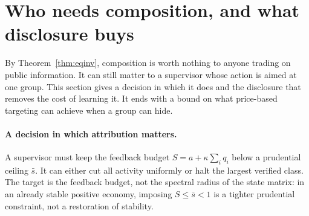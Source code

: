 \documentclass[12pt]{article}
\theoremstyle{definition}
\theoremstyle{remark}
\begin{document}
\section{Who needs composition, and what disclosure buys}\label{sec:supervision}

By Theorem~\ref{thm:eqinv}, composition is worth nothing to anyone trading on public information. It can still matter to a supervisor whose action is aimed at one group. This section gives a decision in which it does and the disclosure that removes the cost of learning it. It ends with a bound on what price-based targeting can achieve when a group can hide.

\paragraph{A decision in which attribution matters.} A supervisor must keep the feedback budget $S=a+\kappa\sum_iq_i$ below a prudential ceiling $\bar s$. It can either cut all activity uniformly or halt the largest verified class. The target is the feedback budget, not the spectral radius of the state matrix: in an already stable positive economy, imposing $S\le\bar s<1$ is a tighter prudential constraint, not a restoration of stability.
\end{document}
